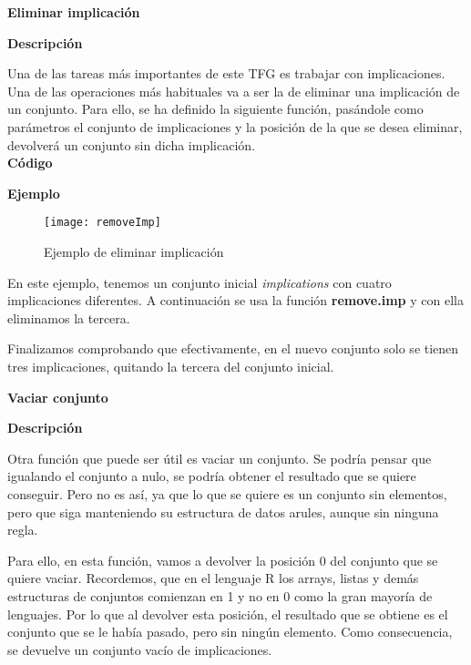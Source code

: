 
\bigskip

\textbf{ \large Eliminar implicaci\'on}

\smallskip

    \textbf{Descripci\'on}

    Una de las tareas m\'as importantes de este TFG es trabajar con implicaciones. Una de las operaciones m\'as habituales 
    va a ser la de eliminar una implicaci\'on de un conjunto. Para ello, se ha definido la siguiente funci\'on, pas\'andole 
    como par\'ametros el conjunto de implicaciones y la posici\'on de la que se desea eliminar, devolver\'a un conjunto sin 
    dicha implicaci\'on.
    \\


    \textbf{C\'odigo}

    
    \bigskip

    \textbf{Ejemplo}

    \begin{figure}[H]
        \centering
        \texttt{[image: removeImp]}
        \caption{Ejemplo de eliminar implicaci\'on}
        \label{fig:removeImp}
    \end{figure}

    En este ejemplo, tenemos un conjunto inicial \textit{implications} con cuatro implicaciones diferentes. A continuaci\'on se usa la 
    funci\'on \textbf{remove.imp} y con ella eliminamos la tercera.

    Finalizamos comprobando que efectivamente, en el nuevo conjunto solo se tienen tres implicaciones, quitando la tercera del conjunto 
    inicial.
    \\


    \bigskip

\textbf{ \large Vaciar conjunto}

\smallskip

    \textbf{Descripci\'on}

    Otra funci\'on que puede ser \'util es vaciar un conjunto. Se podr\'ia pensar que igualando el conjunto a nulo, 
    se podr\'ia obtener el resultado que se quiere conseguir. Pero no es as\'i, ya que lo que se quiere es un conjunto sin 
    elementos, pero que siga manteniendo su estructura de datos arules, aunque sin ninguna regla. 
    
    Para ello, en esta funci\'on, vamos a devolver la posici\'on 0 del conjunto que se quiere vaciar. Recordemos, que en el 
    lenguaje R los arrays, listas y dem\'as estructuras de conjuntos comienzan en 1 y no en 0 como la gran mayor\'ia de lenguajes.
    Por lo que al devolver esta posici\'on, el resultado que se obtiene es el conjunto que se le hab\'ia pasado, pero sin ning\'un 
    elemento. Como consecuencia, se devuelve un conjunto vac\'io de implicaciones.
    \\


